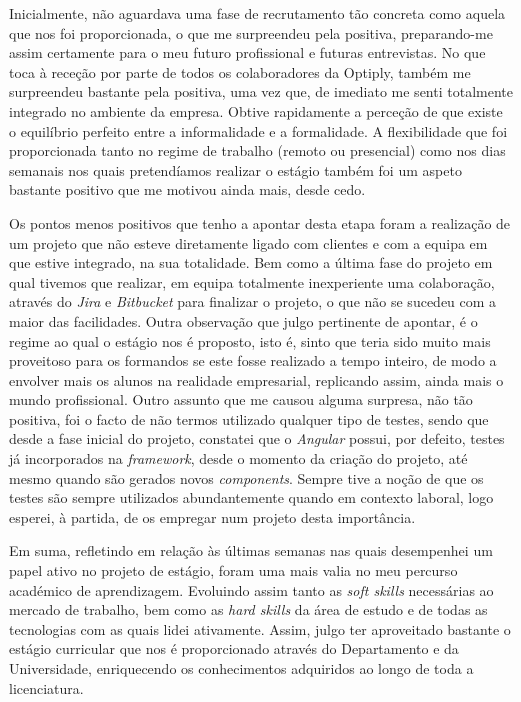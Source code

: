 \documentclass{article}
\begin{document}
\hspace*{0.5cm} Inicialmente, não aguardava uma fase de recrutamento tão concreta como aquela que nos foi proporcionada, o que me surpreendeu pela positiva, preparando-me assim certamente para o meu futuro profissional e futuras entrevistas. \newline
\hspace*{0.5cm} No que toca à receção por parte de todos os colaboradores da Optiply, também me surpreendeu bastante pela positiva, uma vez que, de imediato me senti totalmente integrado no ambiente da empresa. Obtive rapidamente a perceção de que existe o equilíbrio perfeito entre a informalidade e a formalidade. A flexibilidade que foi proporcionada tanto no regime de trabalho (remoto ou presencial) como nos dias semanais nos quais pretendíamos realizar o estágio também foi um aspeto bastante positivo que me motivou ainda mais, desde cedo. \newline

\hspace*{0.5cm} Os pontos menos positivos que tenho a apontar desta etapa foram a realização de um projeto que não esteve diretamente ligado com clientes e com a equipa em que estive integrado, na sua totalidade. Bem como a última fase do projeto em qual tivemos que realizar, em equipa totalmente inexperiente uma colaboração, através do \emph{Jira} e \emph{Bitbucket} para finalizar o projeto, o que não se sucedeu com a maior das facilidades. Outra observação que julgo pertinente de apontar, é o regime ao qual o estágio nos é proposto, isto é, sinto que teria sido muito mais proveitoso para os formandos se este fosse realizado a tempo inteiro, de modo a envolver mais os alunos na realidade empresarial, replicando assim, ainda mais o mundo profissional. \newline
\hspace*{0.5cm} Outro assunto que me causou alguma surpresa, não tão positiva, foi o facto de não termos utilizado qualquer tipo de testes, sendo que desde a fase inicial do projeto, constatei que o \emph{Angular} possui, por defeito, testes já incorporados na \emph{framework}, desde o momento da criação do projeto, até mesmo quando são gerados novos \emph{components}. Sempre tive a noção de que os testes são sempre utilizados abundantemente quando em contexto laboral, logo esperei, à partida, de os empregar num projeto desta importância.

\hspace*{0.5cm} Em suma, refletindo em relação às últimas semanas nas quais desempenhei um papel ativo no projeto de estágio, foram uma mais valia no meu percurso académico de aprendizagem. Evoluindo assim tanto as \emph{soft skills} necessárias ao mercado de trabalho, bem como as \emph{hard skills} da área de estudo e de todas as tecnologias com as quais lidei ativamente. Assim, julgo ter aproveitado bastante o estágio curricular que nos é proporcionado através do Departamento e da Universidade, enriquecendo os conhecimentos adquiridos ao longo de toda a licenciatura.

\cleardoublepage


\label{referencias}
\end{document}
